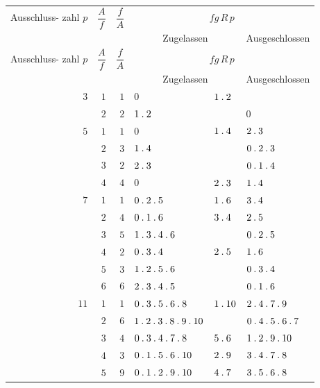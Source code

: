 \clearpage
\begingroup\fontsize{8.3}{9.2}\selectfont\setlength{\tabcolsep}{2pt}\renewcommand{\arraystretch}{1.00}
\begin{longtable}{r|r|r|p{113pt}|p{29pt}|p{120pt}}
\hline
\shortstack{Ausschluss-\\zahl\\$p$} & $\dfrac{A}{f}$ & $\dfrac{f}{A}$ & \multicolumn{3}{c}{$fg\,R\,p$}\\\cline{4-6}
& & & \multicolumn{2}{c|}{Zugelassen} & Ausgeschlossen\\\hline
\endfirsthead
\shortstack{Ausschluss-\\zahl\\$p$} & $\dfrac{A}{f}$ & $\dfrac{f}{A}$ & \multicolumn{3}{c}{$fg\,R\,p$}\\\cline{4-6}
& & & \multicolumn{2}{c|}{Zugelassen} & Ausgeschlossen\\\hline
\endhead
$3$ & $1$ & $1$ & $0$ & $1\mathbin{.} 2$ & \\
 & $2$ & $2$ & $1\mathbin{.} 2$ &  & $0$\\
$5$ & $1$ & $1$ & $0$ & $1\mathbin{.} 4$ & $2\mathbin{.} 3$\\
 & $2$ & $3$ & $1\mathbin{.} 4$ &  & $0\mathbin{.} 2\mathbin{.} 3$\\
 & $3$ & $2$ & $2\mathbin{.} 3$ &  & $0\mathbin{.} 1\mathbin{.} 4$\\
 & $4$ & $4$ & $0$ & $2\mathbin{.} 3$ & $1\mathbin{.} 4$\\
$7$ & $1$ & $1$ & $0\mathbin{.} 2\mathbin{.} 5$ & $1\mathbin{.} 6$ & $3\mathbin{.} 4$\\
 & $2$ & $4$ & $0\mathbin{.} 1\mathbin{.} 6$ & $3\mathbin{.} 4$ & $2\mathbin{.} 5$\\
 & $3$ & $5$ & $1\mathbin{.} 3\mathbin{.} 4\mathbin{.} 6$ &  & $0\mathbin{.} 2\mathbin{.} 5$\\
 & $4$ & $2$ & $0\mathbin{.} 3\mathbin{.} 4$ & $2\mathbin{.} 5$ & $1\mathbin{.} 6$\\
 & $5$ & $3$ & $1\mathbin{.} 2\mathbin{.} 5\mathbin{.} 6$ &  & $0\mathbin{.} 3\mathbin{.} 4$\\
 & $6$ & $6$ & $2\mathbin{.} 3\mathbin{.} 4\mathbin{.} 5$ &  & $0\mathbin{.} 1\mathbin{.} 6$\\
$11$ & $1$ & $1$ & $0\mathbin{.} 3\mathbin{.} 5\mathbin{.} 6\mathbin{.} 8$ & $1\mathbin{.} 10$ & $2\mathbin{.} 4\mathbin{.} 7\mathbin{.} 9$\\
 & $2$ & $6$ & $1\mathbin{.} 2\mathbin{.} 3\mathbin{.} 8\mathbin{.} 9\mathbin{.} 10$ &  & $0\mathbin{.} 4\mathbin{.} 5\mathbin{.} 6\mathbin{.} 7$\\
 & $3$ & $4$ & $0\mathbin{.} 3\mathbin{.} 4\mathbin{.} 7\mathbin{.} 8$ & $5\mathbin{.} 6$ & $1\mathbin{.} 2\mathbin{.} 9\mathbin{.} 10$\\
 & $4$ & $3$ & $0\mathbin{.} 1\mathbin{.} 5\mathbin{.} 6\mathbin{.} 10$ & $2\mathbin{.} 9$ & $3\mathbin{.} 4\mathbin{.} 7\mathbin{.} 8$\\
 & $5$ & $9$ & $0\mathbin{.} 1\mathbin{.} 2\mathbin{.} 9\mathbin{.} 10$ & $4\mathbin{.} 7$ & $3\mathbin{.} 5\mathbin{.} 6\mathbin{.} 8$\\

\end{longtable}
